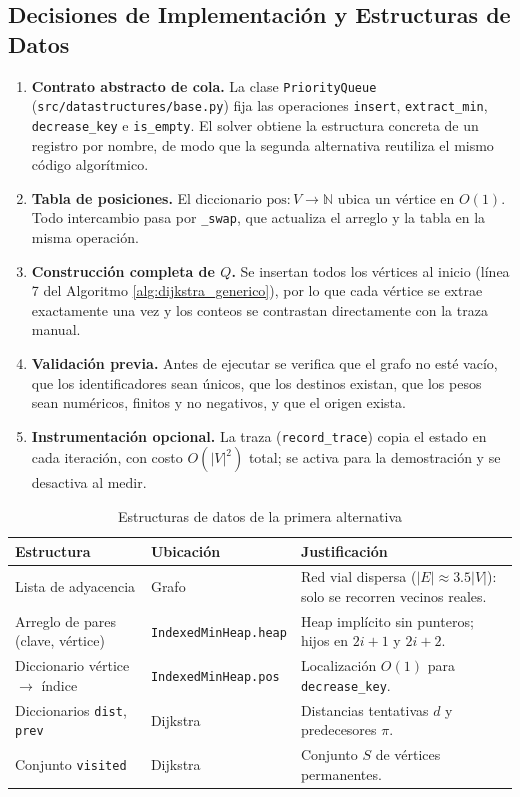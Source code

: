 \subsection{Decisiones de Implementación y Estructuras de Datos}
\begin{enumerate}
    \item \textbf{Contrato abstracto de cola.} La clase \texttt{PriorityQueue} (\texttt{src/datastructures/base.py}) fija las operaciones \texttt{insert}, \texttt{extract\_min}, \texttt{decrease\_key} e \texttt{is\_empty}. El solver obtiene la estructura concreta de un registro por nombre, de modo que la segunda alternativa reutiliza el mismo código algorítmico.
    \item \textbf{Tabla de posiciones.} El diccionario $\text{pos}: V \to \mathbb{N}$ ubica un vértice en $O(1)$. Todo intercambio pasa por \texttt{\_swap}, que actualiza el arreglo y la tabla en la misma operación.
    \item \textbf{Construcción completa de $Q$.} Se insertan todos los vértices al inicio (línea 7 del Algoritmo \ref{alg:dijkstra_generico}), por lo que cada vértice se extrae exactamente una vez y los conteos se contrastan directamente con la traza manual.
    \item \textbf{Validación previa.} Antes de ejecutar se verifica que el grafo no esté vacío, que los identificadores sean únicos, que los destinos existan, que los pesos sean numéricos, finitos y no negativos, y que el origen exista.
    \item \textbf{Instrumentación opcional.} La traza (\texttt{record\_trace}) copia el estado en cada iteración, con costo $O(|V|^2)$ total; se activa para la demostración y se desactiva al medir.
\end{enumerate}

\begin{table}[H]
    \caption{Estructuras de datos de la primera alternativa}
    \label{tab:estructuras_avance4}
    \begin{tabularx}{\textwidth}{@{}>{\raggedright\arraybackslash}p{4.4cm}>{\raggedright\arraybackslash}p{3.6cm}X@{}}
        \toprule
        \textbf{Estructura} & \textbf{Ubicación} & \textbf{Justificación} \\
        \midrule
        Lista de adyacencia & Grafo & Red vial dispersa ($|E| \approx 3.5|V|$): solo se recorren vecinos reales. \\
        Arreglo de pares (clave, vértice) & \texttt{IndexedMinHeap.heap} & Heap implícito sin punteros; hijos en $2i+1$ y $2i+2$. \\
        Diccionario vértice $\to$ índice & \texttt{IndexedMinHeap.pos} & Localización $O(1)$ para \texttt{decrease\_key}. \\
        Diccionarios \texttt{dist}, \texttt{prev} & Dijkstra & Distancias tentativas $d$ y predecesores $\pi$. \\
        Conjunto \texttt{visited} & Dijkstra & Conjunto $S$ de vértices permanentes. \\
        \bottomrule
    \end{tabularx}
\end{table}

